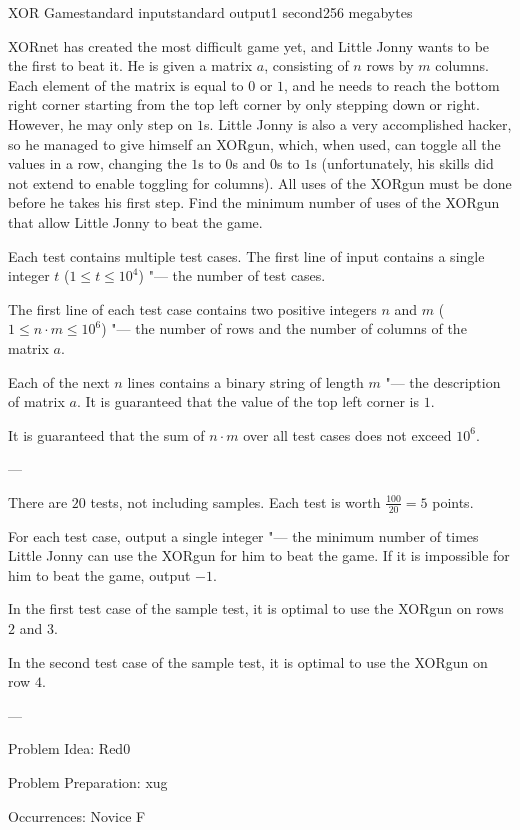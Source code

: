 \begin{problem}{XOR Game}{standard input}{standard output}{1 second}{256 megabytes}

XORnet has created the most difficult game yet, and Little Jonny wants to be the first to beat it. He is given a matrix $a$, consisting of $n$ rows by $m$ columns. Each element of the matrix is equal to $0$ or $1$, and he needs to reach the bottom right corner starting from the top left corner by only stepping down or right. However, he may only step on $1$s. Little Jonny is also a very accomplished hacker, so he managed to give himself an XORgun, which, when used, can toggle all the values in a row, changing the $1$s to $0$s and $0$s to $1$s (unfortunately, his skills did not extend to enable toggling for columns). All uses of the XORgun must be done before he takes his first step. Find the minimum number of uses of the XORgun that allow Little Jonny to beat the game.

\InputFile
Each test contains multiple test cases. The first line of input contains a single integer $t$ ($1 \le t \le 10^4$) "--- the number of test cases.

The first line of each test case contains two positive integers $n$ and $m$ ($1 \le n \cdot m \le 10^6$) "--- the number of rows and the number of columns of the matrix $a$.

Each of the next $n$ lines contains a binary string of length $m$ "--- the description of matrix $a$. It is guaranteed that the value of the top left corner is $1$.

It is guaranteed that the sum of $n \cdot m$ over all test cases does not exceed $10^6$.

---

There are $20$ tests, not including samples. Each test is worth $\frac{100}{20}=5$ points.

\OutputFile
For each test case, output a single integer "--- the minimum number of times Little Jonny can use the XORgun for him to beat the game. If it is impossible for him to beat the game, output $-1$.

\Example

\begin{example}
%
\end{example}

\Note
In the first test case of the sample test, it is optimal to use the XORgun on rows $2$ and $3$.

In the second test case of the sample test, it is optimal to use the XORgun on row $4$.


---

Problem Idea: Red0

Problem Preparation: xug

Occurrences: Novice F

\end{problem}

